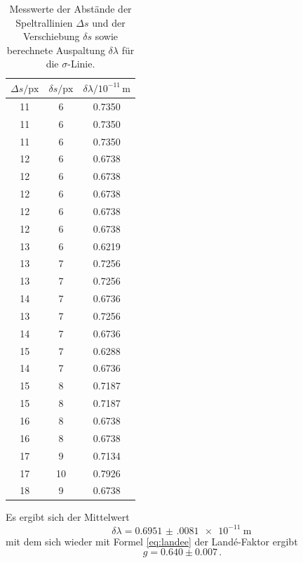 \begin{table}[h]
    \centering
    \caption{Messwerte der Abstände der Speltrallinien $\Delta s$ und der Verschiebung $\delta s$ sowie berechnete Auspaltung $\delta \lambda$ für die $\sigma$-Linie.}
    \label{tab:atab4}
    \begin{tabular}{c c c}
        \toprule
        {$\Delta s / \text{px}$} & {$\delta s / \text{px}$} & {$\delta \lambda / 10^{-11}\, \si{\meter}$}\\
        \midrule
        11 & 6  & 0.7350 \\
        11 & 6  & 0.7350 \\
        11 & 6  & 0.7350 \\
        12 & 6  & 0.6738 \\
        12 & 6  & 0.6738 \\
        12 & 6  & 0.6738 \\
        12 & 6  & 0.6738 \\
        12 & 6  & 0.6738 \\
        13 & 6  & 0.6219 \\
        13 & 7  & 0.7256 \\
        13 & 7  & 0.7256 \\
        14 & 7  & 0.6736 \\
        13 & 7  & 0.7256 \\
        14 & 7  & 0.6736 \\
        15 & 7  & 0.6288 \\
        14 & 7  & 0.6736 \\
        15 & 8  & 0.7187 \\
        15 & 8  & 0.7187 \\
        16 & 8  & 0.6738 \\
        16 & 8  & 0.6738 \\
        17 & 9  & 0.7134 \\
        17 & 10 & 0.7926 \\
        18 & 9  & 0.6738 \\
        \bottomrule
    \end{tabular}
\end{table}
\FloatBarrier
\noindent
Es ergibt sich der Mittelwert
\begin{equation*}
    \delta \lambda = \SI{0.6951(0081)e-11}{\meter} \, 
\end{equation*}
mit dem sich wieder mit Formel \eqref{eq:landee} der Landé-Faktor ergibt
\begin{equation*}
    g = 0.640 \pm 0.007 \, .
\end{equation*}



\nocite{wingate}
\nocite{*}
\printbibliography

